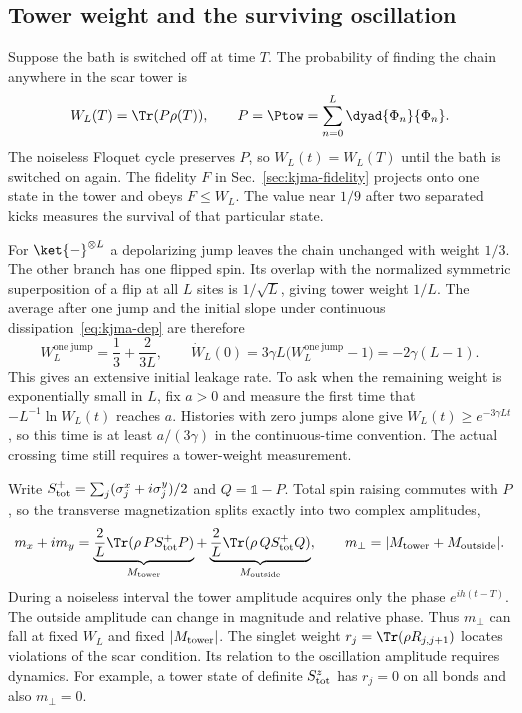 \subsection{Tower weight and the surviving oscillation}
\label{sec:kjma-weight}

Suppose the bath is switched off at time $T$. The probability of finding the chain anywhere in the scar tower is
\begin{equation}
 W_L(T)=\Tr(P\rho(T)),\qquad P=\Ptow=\sum_{n=0}^{L}\dyad{\Phi_n}{\Phi_n}.
\end{equation}
The noiseless Floquet cycle preserves $P$, so $W_L(t)=W_L(T)$ until the bath is switched on again. The fidelity $F$ in Sec.~\ref{sec:kjma-fidelity} projects onto one state in the tower and obeys $F\le W_L$. The value near $1/9$ after two separated kicks measures the survival of that particular state.

For $\ket{-}^{\otimes L}$ a depolarizing jump leaves the chain unchanged with weight $1/3$. The other branch has one flipped spin. Its overlap with the normalized symmetric superposition of a flip at all $L$ sites is $1/\sqrt L$, giving tower weight $1/L$. The average after one jump and the initial slope under continuous dissipation~\eqref{eq:kjma-dep} are therefore
\begin{equation}
 W_L^{\mathrm{one\ jump}}=\frac13+\frac{2}{3L},\qquad
 \dot W_L(0)=3\gamma L\big(W_L^{\mathrm{one\ jump}}-1\big)=-2\gamma(L-1).
 \label{eq:kjma-leakage}
\end{equation}
This gives an extensive initial leakage rate. To ask when the remaining weight is exponentially small in $L$, fix $a>0$ and measure the first time that $-L^{-1}\ln W_L(t)$ reaches $a$. Histories with zero jumps alone give $W_L(t)\ge e^{-3\gamma Lt}$, so this time is at least $a/(3\gamma)$ in the continuous-time convention. The actual crossing time still requires a tower-weight measurement.

Write $S^+_{\rm tot}=\sum_j(\sigma^x_j+i\sigma^y_j)/2$ and $Q=\mathds 1-P$. Total spin raising commutes with $P$, so the transverse magnetization splits exactly into two complex amplitudes,
\begin{equation}
 m_x+i m_y =
 \underbrace{\frac{2}{L}\Tr(\rho\,P S^+_{\rm tot}P)}_{M_{\rm tower}}
 +\underbrace{\frac{2}{L}\Tr(\rho\,Q S^+_{\rm tot}Q)}_{M_{\rm outside}},
 \qquad m_\perp=|M_{\rm tower}+M_{\rm outside}|.
 \label{eq:kjma-osc-sectors}
\end{equation}
During a noiseless interval the tower amplitude acquires only the phase $e^{ih(t-T)}$. The outside amplitude can change in magnitude and relative phase. Thus $m_\perp$ can fall at fixed $W_L$ and fixed $|M_{\rm tower}|$. The singlet weight $r_j=\Tr(\rho R_{j,j+1})$ locates violations of the scar condition. Its relation to the oscillation amplitude requires dynamics. For example, a tower state of definite $S^z_{\rm tot}$ has $r_j=0$ on all bonds and also $m_\perp=0$.

